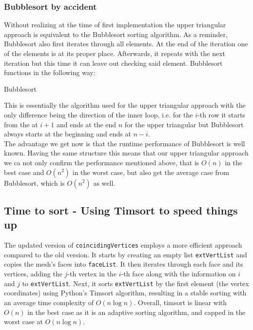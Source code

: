\subsubsection{Bubblesort by accident}
Without realizing at the time of first implementation the upper triangular approach is equivalent to the Bubblesort sorting algorithm. As a reminder, Bubblesort also first iterates through all elements. At the end of the iteration one of the elements is at its proper place. Afterwards, it repeats with the next iteration but this time it can leave out checking said element. Bubblesort functions in the following way:\\
\begin{algorithm}[H]
    \SetAlgoLined

    \caption{Bubblesort}
    \label{alg:bubblesort}
\end{algorithm}

This is essentially the algorithm used for the upper triangular approach with the only difference being the direction of the inner loop, i.e. for the $i$-th row it starts from the at $i+1$ and ends at the end $n$ for the upper triangular but Bubblesort always starts at the beginning and ends at $n-i$.\\
The advantage we get now is that the runtime performance of Bubblesort is well known. Having the same structure this means that our upper triangular approach we ca not only confirm the performance mentioned above, that is $O(n)$ in the best case and $O(n^2)$ in the worst case, but also get the average case from Bubblesort, which is $O(n^2)$ as well.

\subsection{Time to sort - Using Timsort to speed things up}
The updated version of \texttt{coincidingVertices} employs a more efficient approach compared to the old version. It starts by creating an empty list \texttt{extVertList} and copies the mesh's faces into \texttt{faceList}. It then iterates through each face and its vertices, adding the $j$-th vertex in the $i$-th face along with the information on $i$ and $j$ to \texttt{extVertList}. Next, it sorts \texttt{extVertList} by the first element (the vertex coordinates) using Python's Timsort algorithm, resulting in a stable sorting with an average time complexity of $O(n\log n)$. Overall, timsort is linear with $O(n)$ in the best case as it is an adaptive sorting algorithm, and capped in the worst case at $O(n\log n)$.

